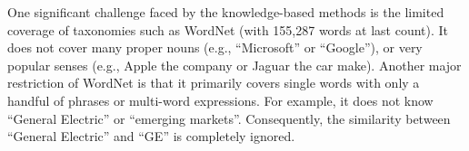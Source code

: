 One significant challenge faced by the knowledge-based methods is the
limited coverage of taxonomies such as WordNet (with 155,287 words
at last count).
It does not cover many proper nouns (e.g., ``Microsoft''
or ``Google''), or very popular senses (e.g., Apple the company or
Jaguar the car make). Another major restriction of WordNet is that it
primarily covers single words with only a handful of phrases or
multi-word expressions.  For example, it does not know ``General
Electric'' or ``emerging markets''.
Consequently, the similarity between ``General Electric'' and ``GE''
is completely ignored.
%

